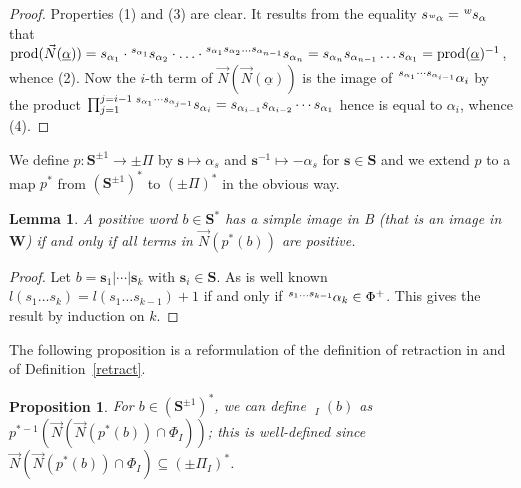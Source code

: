 \documentclass{amsart}
\numberwithin{equation}{section}
\newtheorem{lemma}[equation]{Lemma}
\newtheorem{proposition}[equation]{Proposition}
\newcommand\vN{\vec N}
\newcommand\lexp[2]{\kern\scriptspace\vphantom{#2}^{#1}\kern-\scriptspace#2}
\newcommand\inv{^{-1}}
\newcommand\bs{{\mathbf s}}
\newcommand\bS{{\mathbf S}}
\newcommand\bW{{\mathbf W}}
\DeclareMathOperator\hpi{\hat\pi}
\DeclareMathOperator\product{prod}
\begin{document}
\begin{proof}
Properties  (1) and (3) are clear. It results from
the equality $s_{\lexp w\alpha}=\lexp w s_\alpha$ that
$\product(\vN(\underline\alpha))=s_{\alpha_1}\cdot
\lexp{s_{\alpha_1}}s_{\alpha_2}\cdot\ldots\cdot
\lexp{s_{\alpha_1}s_{\alpha_2}\ldots
s_{\alpha_{n-1}}}s_{\alpha_n}=s_{\alpha_n}s_{\alpha_{n-1}}\ldots
s_{\alpha_1}=
\product(\underline\alpha)\inv$, whence (2). 
Now the $i$-th term of $\vN(\vN(\underline\alpha))$ is the image of
$\lexp{s_{\alpha_1}\cdots s_{\alpha_{i-1}}}\alpha_i$ by the product $\prod_{j=1}^{j=i-1}
\lexp{s_{\alpha_1}\cdots s_{\alpha_{j-1}}}s_{\alpha_i}=s_{\alpha_{i-1}}s_{\alpha_{i-2}}\cdots
s_{\alpha_1}$ hence is equal to $\alpha_i$, whence (4).
\end{proof}
We define  $p:\bS^{\pm1}\to\pm\Pi$ by $\bs\mapsto\alpha_s$ and
$\bs\inv\mapsto-\alpha_s$ for $\bs\in\bS$ and we extend $p$ to a map $p^*$ from
$(\bS^{\pm1})^*$ to $(\pm\Pi)^*$ in the obvious way. 
\begin{lemma}\label{simple}
A positive word $b\in\bS^*$ has a simple image in B (that is an image
in $\bW$) if and only if all terms in $\vN(p^*(b))$ are
positive.
\end{lemma}
\begin{proof}
Let $b=\bs_1|\cdots|\bs_k$ with $\bs_i\in \bS$. As is well known $l(s_1\ldots
s_k)=l(s_1\ldots s_{k-1})+1$ if and only if $\lexp{s_1\ldots s_{k-1}}\alpha_k \in\Phi^+$.
This gives the result by induction on $k$.
\end{proof}
The following proposition is a reformulation of the definition of retraction
in \cite[Definition 2.1]{godelle} and of Definition~\ref{retract}.
\begin{proposition}\label{other way} For $b\in(\bS^{\pm1})^*$,
we can define $\hpi_I(b)$ as
$p^{*-1}(\vN(\vN(p^*(b))\cap \Phi_I))$; this is well-defined since
$\vN(\vN(p^*(b))\cap \Phi_I)\subseteq (\pm \Pi_I)^*$. 
\end{proposition}
\end{document}
